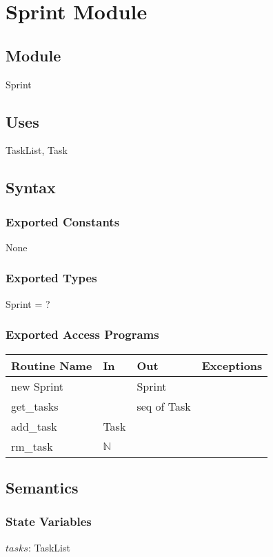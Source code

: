 \documentclass[12pt, titlepage]{article}
\begin{document}
\section* {Sprint Module}

\subsection*{Module}
Sprint

\subsection* {Uses}
TaskList, Task 

\subsection* {Syntax}
\subsubsection* {Exported Constants}
None

\subsubsection* {Exported Types}
Sprint = ?

\subsubsection* {Exported Access Programs}
\begin{tabular}{|l|l|l|l|}
    \hline
    \textbf{Routine Name} & \textbf{In} & \textbf{Out} & \textbf{Exceptions} \\
    \hline
    new Sprint & & Sprint & \\
    \hline
    get\_tasks & & seq of Task &\\
    \hline
    add\_task & Task & & \\
    \hline
    rm\_task & $\mathbb{N}$ & &\\
    \hline
\end{tabular}

\subsection*{Semantics}
\subsubsection*{State Variables}
$tasks$: TaskList
\end{document}
